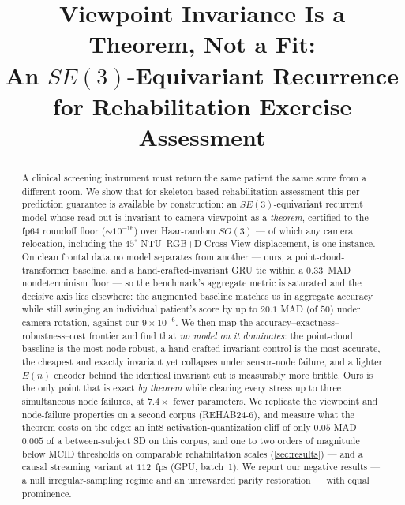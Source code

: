 \documentclass[10pt,twocolumn,letterpaper]{article}
\begin{document}
\title{Viewpoint Invariance Is a Theorem, Not a Fit:\\
An $SE(3)$-Equivariant Recurrence for Rehabilitation Exercise Assessment}
\author{}  %
\maketitle

\begin{abstract}
A clinical screening instrument must return the same patient the same score from a different room. We
show that for skeleton-based rehabilitation assessment this per-prediction guarantee is available by
construction: an $SE(3)$-equivariant recurrent model whose read-out is invariant to camera viewpoint
as a \emph{theorem}, certified to the fp64 roundoff floor ($\sim\!10^{-16}$) over Haar-random
$SO(3)$ --- of which any camera relocation, including the $45^\circ$ NTU~RGB+D Cross-View
displacement, is one instance. On clean frontal
data no model separates from another --- ours, a point-cloud-transformer baseline, and a
hand-crafted-invariant GRU tie within a $0.33$~MAD nondeterminism floor --- so the benchmark's aggregate
metric is saturated and the decisive axis lies elsewhere: the augmented baseline
matches us in aggregate accuracy while still swinging an individual patient's score by up to $20.1$ MAD
(of $50$) under camera rotation, against our $9\times10^{-6}$. We then map the
accuracy--exactness--robustness--cost frontier and find that \emph{no model on it dominates}: the
point-cloud baseline is the most node-robust, a hand-crafted-invariant
control is the most accurate, the cheapest and exactly invariant yet collapses under sensor-node failure, and a lighter
$E(n)$ encoder behind the identical invariant cut is measurably more brittle. Ours is the only point
that is exact \emph{by theorem} while clearing every stress up to three simultaneous node failures,
at $7.4\times$ fewer parameters. We
replicate the viewpoint and node-failure properties on a second corpus (REHAB24-6), and measure what
the theorem costs on the edge: an int8 activation-quantization cliff of only $0.05$ MAD --- $0.005$ of a
between-subject SD on this corpus, and one to two
orders of magnitude below MCID thresholds on comparable rehabilitation scales (\cref{sec:results})
--- and a causal streaming variant at $112$~fps (GPU, batch~1). We report our negative results --- a
null irregular-sampling regime and an unrewarded parity restoration --- with equal prominence.
\end{abstract}
\end{document}
